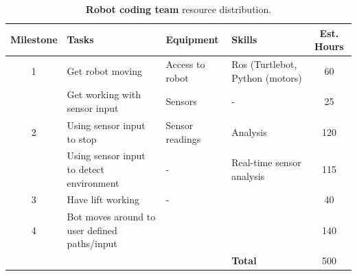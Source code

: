\documentclass{article}
\begin{document}
\begin{table}[]
  \begin{center}
  \begin{small}
  \begin{tabular}{|c|l|l|l|c|}
    \hline
    {\bf Milestone} & {\bf Tasks} & {\bf Equipment} & {\bf Skills} & {\bf Est. Hours} \\ \hline
    1               & Get robot moving & Access to robot & Ros (Turtlebot, Python (motors) & 60 \\ \cline{2-5}
                    & Get working with sensor input & Sensors & - & 25 \\ \hline
    2               & Using sensor input to stop & Sensor readings & Analysis & 120 \\ \cline{2-5}
                    & Using sensor input to detect environment & - & Real-time sensor analysis & 115 \\ \hline
    3               & Have lift working & - &  & 40 \\ \hline
    4               & Bot moves around to user defined paths/input &  &  & 140 \\ \hline
                    &  &  & {\bf Total} & 500 \\ \hline
  \end{tabular}
  \end{small}
  \caption{{\bf Robot coding team} resource distribution.}
  \end{center}
\end{table}
\end{document}

